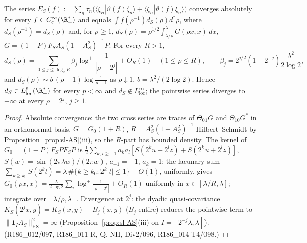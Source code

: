 \begin{theorem}\label{thm:sl-L2}
The series $E_S(f):=\sum_n\tau_n\big(\langle\xi_n|\vartheta(f)\zeta_n\rangle+\langle\zeta_n|\vartheta(f)\xi_n\rangle\big)$
converges absolutely for every $f\in C_c^\infty(\R_+^*)$ and equals $\int f(\rho^{-1})d_S(\rho)d^*\rho$, where
$d_S(\rho^{-1})=d_S(\rho)$ and, for $\rho\ge1$,
$d_S(\rho)=\rho^{1/2}\int_{\lambda/\rho}^{\lambda}G(\rho x,x)\,dx$, $G=(1-P)F_SA_S(1-A_S^2)^{-1}P$. For every $R>1$,
\[
d_S(\rho)=\sum_{0\le j\le\log_2R}\beta_j\log^+\frac1{|\rho-2^j|}+O_R(1)\quad(1\le\rho\le R),\qquad
\beta_j=2^{j/2}(1-2^{-j})\frac{\lambda^2}{2\log2},
\]
and $d_S(\rho)\sim b\,(\rho-1)\log\frac1{\rho-1}$ as $\rho\downarrow1$, $b=\lambda^2/(2\log2)$. Hence
$d_S\in L^p_{\mathrm{loc}}(\R_+^*)$ for every $p<\infty$ and $d_S\notin L^\infty_{\mathrm{loc}}$; the pointwise series
diverges to $+\infty$ at every $\rho=2^j$, $j\ge1$.
\end{theorem}
\begin{proof}
Absolute convergence: the two cross series are traces of $\Theta_{01}G$ and $\Theta_{10}G^*$ in an orthonormal basis.
$G=G_0(1+R)$, $R=A_S^2(1-A_S^2)^{-1}$ Hilbert--Schmidt by Proposition~\ref{prop:sl-AS}(iii), so the $R$-part has
bounded density. The kernel of $G_0=(1-P)F_SPF_SP$ is
$\frac12\sum_{k,l\ge-1}a_ka_l[S(2^ku-2^lz)+S(2^ku+2^lz)]$, $S(w)=\sin(2\pi\lambda w)/(2\pi w)$, $a_{-1}=-1$, $a_k=1$;
the lacunary sum $\sum_{k\ge k_0}S(2^kt)=\lambda\,\#\{k\ge k_0:2^k|t|\le1\}+O(1)$, uniformly, gives
$G_0(\rho x,x)=\frac{\lambda}{2\log2}\sum_i\log^+\frac1{|\rho-2^i|}+O_R(1)$ uniformly in $x\in[\lambda/R,\lambda]$;
integrate over $[\lambda/\rho,\lambda]$. Divergence at $2^j$: the dyadic quasi-covariance
$K_S(2^jx,y)=K_S(x,y)-B_j(x,y)$ ($B_j$ entire) reduces the pointwise term to $\|\mathbf 1_{I}A_S\|_{\mathrm{HS}}^2=\infty$
(Proposition~\ref{prop:sl-AS}(iii) on $I=[2^{-j}\lambda,\lambda]$). (R186\_012/097, R186\_011 R, Q, NH, Div2/096,
R186\_014 T4/098.)
\end{proof}

